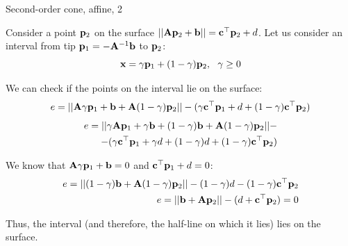 \documentclass{beamer}
\begin{document}
\begin{frame}{Second-order cone, affine, 2}
	\begin{flushleft}
		
		Consider a point $\mathbf{p}_2$ on the surface $||\mathbf{A}\mathbf{p}_2+\mathbf{b}|| = \mathbf{c}^\top \mathbf{p}_2 + d$. Let us consider an interval from tip $\mathbf{p}_1 = -\mathbf{A}^{-1}\mathbf{b}$ to $\mathbf{p}_2$:
		\begin{equation}
			\mathbf{x} = \gamma \mathbf{p}_1 + (1 - \gamma) \mathbf{p}_2, \ \ \gamma \geq 0
		\end{equation}
		
		We can check if the points on the interval lie on the surface:
		\begin{align*}
			e = ||\mathbf{A}\gamma \mathbf{p}_1+\mathbf{b} + \mathbf{A}(1 - \gamma) \mathbf{p}_2|| - (\gamma  \mathbf{c}^\top\mathbf{p}_1 + d + (1 - \gamma)  \mathbf{c}^\top\mathbf{p}_2)
		\end{align*}
		\begin{align*}
			e = ||\gamma\mathbf{A} \mathbf{p}_1+\gamma\mathbf{b} + (1-\gamma)\mathbf{b} + \mathbf{A}(1 - \gamma) \mathbf{p}_2|| - \\ - (\gamma  \mathbf{c}^\top\mathbf{p}_1 + \gamma d + (1-\gamma)d + (1 - \gamma)  \mathbf{c}^\top\mathbf{p}_2)
		\end{align*}
		
		We know that $\mathbf{A}\gamma \mathbf{p}_1+\mathbf{b} = 0$ and $\mathbf{c}^\top\mathbf{p}_1 + d = 0$:
		\begin{align}
			e = || (1-\gamma)\mathbf{b} + \mathbf{A}(1 - \gamma) \mathbf{p}_2|| - (1-\gamma)d - (1 - \gamma)  \mathbf{c}^\top\mathbf{p}_2
			\\
			e = || \mathbf{b} + \mathbf{A}\mathbf{p}_2|| - (d +\mathbf{c}^\top\mathbf{p}_2) = 0
		\end{align}
		
		Thus, the interval (and therefore, the half-line on which it lies) lies on the surface.
		
	\end{flushleft}
\end{frame}
\end{document}
